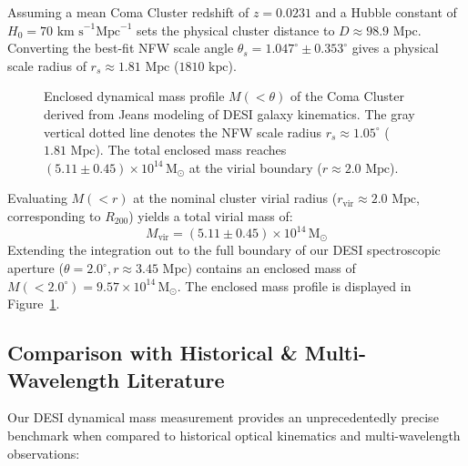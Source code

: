 \documentclass[twocolumn]{aastex631}
\begin{document}
Assuming a mean Coma Cluster redshift of $z = 0.0231$ and a Hubble constant of $H_0 = 70 \text{ km s}^{-1} \text{Mpc}^{-1}$ sets the physical cluster distance to $D \approx 98.9 \text{ Mpc}$. Converting the best-fit NFW scale angle $\theta_s = 1.047^\circ \pm 0.353^\circ$ gives a physical scale radius of $r_s \approx 1.81 \text{ Mpc}$ ($1810 \text{ kpc}$).

\begin{figure}[ht!]
	\centering
	\caption{Enclosed dynamical mass profile $M(<\theta)$ of the Coma Cluster derived from Jeans modeling of DESI galaxy kinematics. The gray vertical dotted line denotes the NFW scale radius $r_s \approx 1.05^\circ$ ($1.81 \text{ Mpc}$). The total enclosed mass reaches $(5.11 \pm 0.45) \times 10^{14} \, \mathrm{M}_\odot$ at the virial boundary ($r \approx 2.0 \text{ Mpc}$).}
	\label{fig:mass_profile}
\end{figure}

Evaluating $M(<r)$ at the nominal cluster virial radius ($r_{\text{vir}} \approx 2.0 \text{ Mpc}$, corresponding to $R_{200}$) yields a total virial mass of:
\begin{equation}
	M_{\text{vir}} = (5.11 \pm 0.45) \times 10^{14} \, \mathrm{M}_\odot
\end{equation}
Extending the integration out to the full boundary of our DESI spectroscopic aperture ($\theta = 2.0^\circ, r \approx 3.45 \text{ Mpc}$) contains an enclosed mass of $M(<2.0^\circ) = 9.57 \times 10^{14} \, \mathrm{M}_\odot$. The enclosed mass profile is displayed in Figure~\ref{fig:mass_profile}.

\subsection{Comparison with Historical \& Multi-Wavelength Literature}

Our DESI dynamical mass measurement provides an unprecedentedly precise benchmark when compared to historical optical kinematics and multi-wavelength observations:
\end{document}
